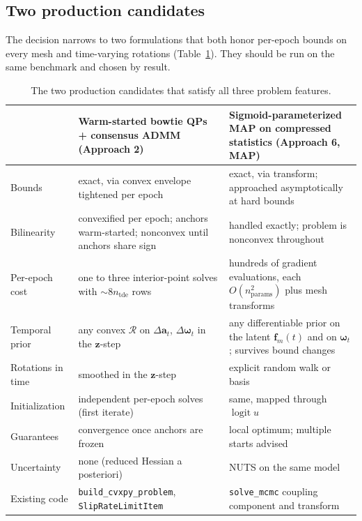 \documentclass[11pt]{article}
\newcommand{\vect}[1]{\bm{#1}}
\newcommand{\code}[1]{\texttt{#1}}
\DeclareMathOperator{\logit}{logit}
\begin{document}
\subsection{Two production candidates}

The decision narrows to two formulations that both honor per-epoch bounds on every mesh and time-varying rotations (Table~\ref{tab:candidates}). They should be run on the same benchmark and chosen by result.

\begin{table}[h]
\centering
\small
\renewcommand{\arraystretch}{1.15}
\begin{tabular}{@{}>{\raggedright\arraybackslash}p{3.0cm}>{\raggedright\arraybackslash}p{5.6cm}>{\raggedright\arraybackslash}p{5.6cm}@{}}
\toprule
 & Warm-started bowtie QPs + consensus ADMM (Approach 2) & Sigmoid-parameterized MAP on compressed statistics (Approach 6, MAP) \\
\midrule
Bounds & exact, via convex envelope tightened per epoch & exact, via transform; approached asymptotically at hard bounds \\
Bilinearity & convexified per epoch; anchors warm-started; nonconvex until anchors share sign & handled exactly; problem is nonconvex throughout \\
Per-epoch cost & one to three interior-point solves with $\sim 8 n_{\mathrm{tde}}$ rows & hundreds of gradient evaluations, each $O(n_{\mathrm{params}}^2)$ plus mesh transforms \\
Temporal prior & any convex $\mathcal{R}$ on $\Delta\vect{a}_t$, $\Delta\vect{\omega}_t$ in the $\vect{z}$-step & any differentiable prior on the latent $\vect{f}_m(t)$ and on $\vect{\omega}_t$; survives bound changes \\
Rotations in time & smoothed in the $\vect{z}$-step & explicit random walk or basis \\
Initialization & independent per-epoch solves (first iterate) & same, mapped through $\logit u$ \\
Guarantees & convergence once anchors are frozen & local optimum; multiple starts advised \\
Uncertainty & none (reduced Hessian a posteriori) & NUTS on the same model \\
Existing code & \code{build\_cvxpy\_problem}, \code{SlipRateLimitItem} & \code{solve\_mcmc} coupling component and transform \\
\bottomrule
\end{tabular}
\caption{The two production candidates that satisfy all three problem features.}
\label{tab:candidates}
\end{table}
\end{document}
